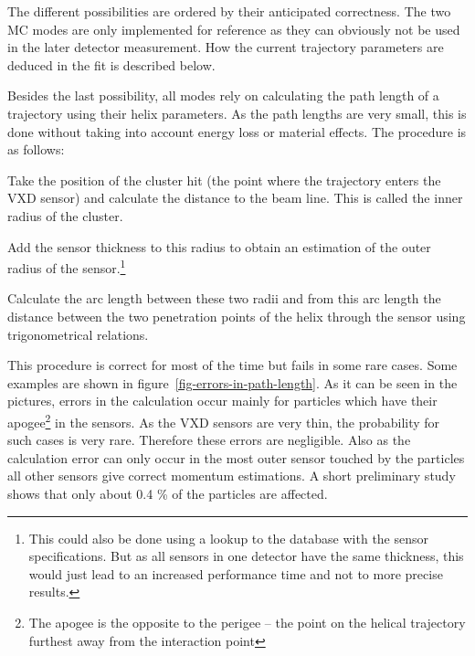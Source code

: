 The different possibilities are ordered by their anticipated correctness. The two MC modes are only implemented for reference as they can obviously not be used in the later detector measurement. How the current trajectory parameters are deduced in the fit is described below.

Besides the last possibility, all modes rely on calculating the path length of a trajectory using their helix parameters. As the path lengths are very small, this is done without taking into account energy loss or material effects. The procedure is as follows:
\begin{zlist}
 \item Take the position of the cluster hit (the point where the trajectory enters the VXD sensor) and calculate the distance to the beam line. This is called the inner radius of the cluster.
 \item Add the sensor thickness to this radius to obtain an estimation of the outer radius of the sensor.\footnote{This could also be done using a lookup to the database with the sensor specifications. But as all sensors in one detector have the same thickness, this would just lead to an increased performance time and not to more precise results.}
 \item Calculate the arc length between these two radii and from this arc length the distance between the two penetration points of the helix through the sensor using trigonometrical relations.
\end{zlist}

This procedure is correct for most of the time but fails in some rare cases. Some examples are shown in figure~\ref{fig-errors-in-path-length}. As it can be seen in the pictures, errors in the calculation occur mainly for particles which have their apogee\footnote{The apogee is the opposite to the perigee -- the point on the helical trajectory furthest away from the interaction point} in the sensors. As the VXD sensors are very thin, the probability for such cases is very rare. Therefore these errors are negligible. Also as the calculation error can only occur in the most outer sensor touched by the particles all other sensors give correct momentum estimations. A short preliminary study shows that only about 0.4 \% of the particles are affected.

